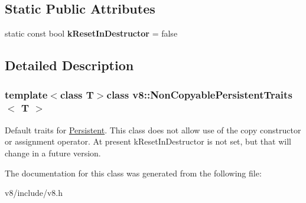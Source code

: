 \subsection*{Static Public Attributes}
\begin{DoxyCompactItemize}
\item 
\hypertarget{classv8_1_1NonCopyablePersistentTraits_a650880d85ff80634c30a195d20329681}{static const bool {\bfseries k\-Reset\-In\-Destructor} = false}\label{classv8_1_1NonCopyablePersistentTraits_a650880d85ff80634c30a195d20329681}

\end{DoxyCompactItemize}


\subsection{Detailed Description}
\subsubsection*{template$<$class T$>$class v8\-::\-Non\-Copyable\-Persistent\-Traits$<$ T $>$}

Default traits for \hyperlink{classv8_1_1Persistent}{Persistent}. This class does not allow use of the copy constructor or assignment operator. At present k\-Reset\-In\-Destructor is not set, but that will change in a future version. 

The documentation for this class was generated from the following file\-:\begin{DoxyCompactItemize}
\item 
v8/include/v8.\-h\end{DoxyCompactItemize}
